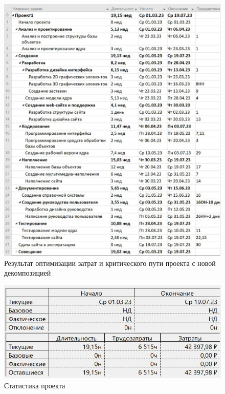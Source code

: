 \begin{figure}[H]
	\begin{center}
		\includegraphics[scale=0.3]{inc/img/result.jpg}
	\end{center}
	\captionsetup{justification=centering}
	\caption{Результат оптимизации затрат и критического пути проекта с новой декомпозицией}
	\label{img:result}
\end{figure}

\begin{figure}[H]
	\begin{center}
		\includegraphics[scale=0.45]{inc/img/result-stat.jpg}
	\end{center}
	\captionsetup{justification=centering}
	\caption{Статистика проекта}
	\label{img:result-stat}
\end{figure}

